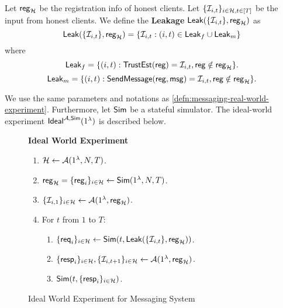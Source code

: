 \begin{definition}
\label{defn:messaging-leakage}
Let $\mathsf{reg}_{\mathcal{H}}$ be the registration info of honest clients. Let $\{\mathcal{I}_{i, t}\}_{i \in \mathcal{H}, t \in [T]}$ be the input from honest clients. We define the \textbf{Leakage} $\mathsf{Leak}(\{\mathcal{I}_{i, t}\}, \mathsf{reg}_{\mathcal{H}})$ as
$$\mathsf{Leak}(\{\mathcal{I}_{i, t}\}, \mathsf{reg}_{\mathcal{H}}) = \{\mathcal{I}_{i, t}: (i, t) \in \mathsf{Leak}_f \cup \mathsf{Leak}_m\}$$
where
$$\mathsf{Leak}_f = \{(i, t): \mathsf{TrustEst}(\mathsf{reg}) = \mathcal{I}_{i, t}, \mathsf{reg} \notin \mathsf{reg}_{\mathcal{H}}\}.$$
$$\mathsf{Leak}_m = \{(i, t): \mathsf{SendMessage}(\mathsf{reg}, \mathsf{msg}) = \mathcal{I}_{i, t}, \mathsf{reg} \notin \mathsf{reg}_{\mathcal{H}}\}.$$
\end{definition}
\begin{definition}
\label{defn:messaging-ideal-world-experiment}
We use the same parameters and notations as \cref{defn:messaging-real-world-experiment}. Furthermore, let $\mathsf{Sim}$ be a stateful simulator. The ideal-world experiment $\mathsf{Ideal}^{\mathcal{A}, \mathsf{Sim}}(1^{\lambda})$ is described below.
\begin{figure}[h]
\begin{framed}
\textbf{Ideal World Experiment}
\begin{enumerate}
\item $\mathcal{H} \leftarrow \mathcal{A}(1^{\lambda}, N, T)$.
\item $\mathsf{reg}_{\mathcal{H}} = \{\mathsf{reg}_i\}_{i \in \mathcal{H}} \leftarrow \mathsf{Sim}(1^{\lambda}, N, T)$. 
\item $\{\mathcal{I}_{i, 1}\}_{i \in \mathcal{H}} \leftarrow \mathcal{A}(1^{\lambda}, \mathsf{reg}_{\mathcal{H}})$.
\item For $t$ from $1$ to $T$:
    \begin{enumerate}
    \item  $\{\mathsf{req}_i\}_{i \in \mathcal{H}} \leftarrow \mathsf{Sim}(t, \mathsf{Leak}(\{\mathcal{I}_{i, t}\}, \mathsf{reg}_{\mathcal{H}}))$.
    
    \item $\{\mathsf{resp}_i\}_{i \in \mathcal{H}}, \{\mathcal{I}_{i, t + 1}\}_{i \in \mathcal{H}} \leftarrow \mathcal{A}(1^{\lambda}, \mathsf{reg}_{\mathcal{H}})$.
    
    \item $\mathsf{Sim}(t, \{\mathsf{resp}_i\}_{i \in \mathcal{H}})$.
    \end{enumerate}
\end{enumerate}
\end{framed}
\label{expr:messaging-ideal-world}
\caption{Ideal World Experiment for Messaging System}
\end{figure}

\end{definition}

